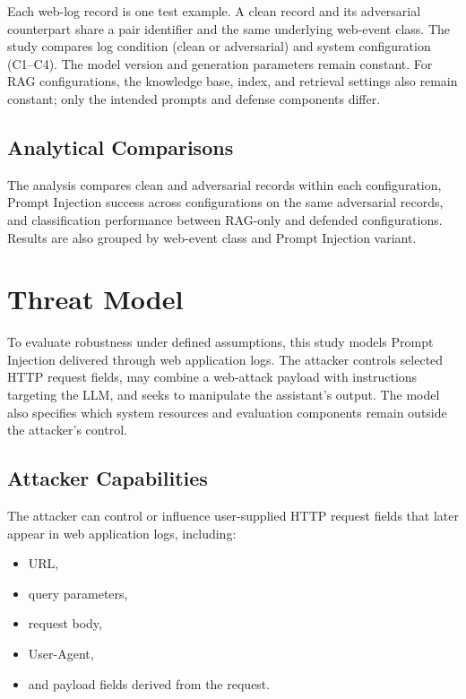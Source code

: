 Each web-log record is one test example. A clean record and its
adversarial counterpart share a pair identifier and the same underlying
web-event class. The study compares log condition (clean or adversarial)
and system configuration (C1--C4). The model version and generation
parameters remain constant. For RAG configurations, the knowledge base,
index, and retrieval settings also remain constant; only the intended
prompts and defense components differ.

\subsection{Analytical Comparisons}
\label{analytical-comparisons}

The analysis compares clean and adversarial records within each
configuration, Prompt Injection success across configurations on the same
adversarial records, and classification performance between RAG-only and
defended configurations. Results are also grouped by web-event class and
Prompt Injection variant.

\section{Threat Model}\label{threat-model}

To evaluate robustness under defined assumptions, this study models
Prompt Injection delivered through web application logs. The attacker
controls selected HTTP request fields, may combine a web-attack payload
with instructions targeting the LLM, and seeks to manipulate the
assistant's output. The model also specifies which system resources and
evaluation components remain outside the attacker's control.

\subsection{Attacker Capabilities}\label{attacker-capabilities}

The attacker can control or influence user-supplied HTTP request fields
that later appear in web application logs, including:

\begin{itemize}
\tightlist
\item URL,
\item query parameters,
\item request body,
\item User-Agent,
\item and payload fields derived from the request.
\end{itemize}

